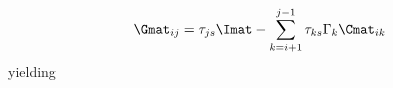 \begin{equation}
\Gmat_{i j} = \tau_{ j s} \Imat - \sum\limits_{k = i + 1}^{j-1}\tau_{k s }\Gamma_k\Cmat_{i k} 
\end{equation}
yielding
